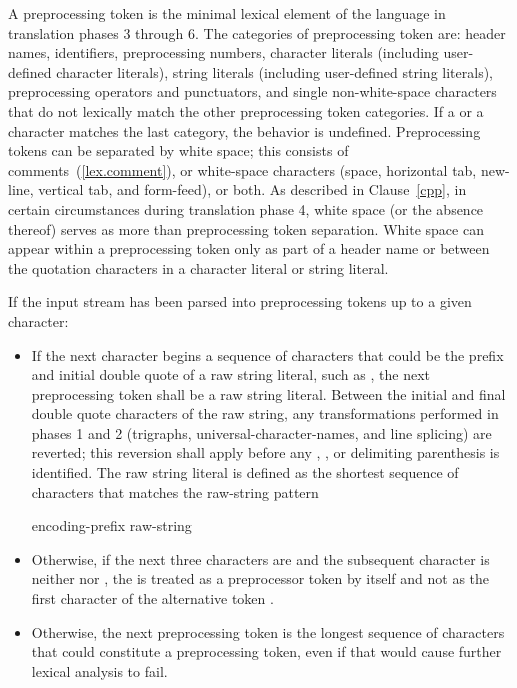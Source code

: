 \pnum
A preprocessing token is the minimal lexical element of the language in translation
phases 3 through 6. The categories of preprocessing token are: header names,
identifiers, preprocessing numbers, character literals (including user-defined character
literals), string literals (including user-defined string literals), preprocessing
operators and punctuators, and single non-white-space characters that do not lexically
match the other preprocessing token categories. If a  or a  character
matches the last category, the behavior is undefined. Preprocessing tokens can be
separated by
%
white space;
%
this consists of comments~(\ref{lex.comment}), or white-space
characters (space, horizontal tab, new-line, vertical tab, and
form-feed), or both. As described in Clause~\ref{cpp}, in certain
circumstances during translation phase 4, white space (or the absence
thereof) serves as more than preprocessing token separation. White space
can appear within a preprocessing token only as part of a header name or
between the quotation characters in a character literal or string
literal.

\pnum
If the input stream has been parsed into preprocessing tokens up to a
given character:

\begin{itemize}
\item If the next character begins a sequence of characters that could be the prefix
and initial double quote of a raw string literal, such as , the next preprocessing
token shall be a raw string literal. Between the initial and final
double quote characters of the raw string, any transformations performed in phases
1 and 2 (trigraphs, universal-character-names, and line splicing) are reverted; this reversion
shall apply before any , , or delimiting
parenthesis is identified. The raw string literal is defined as the shortest sequence
of characters that matches the raw-string pattern

\begin{ncsimplebnf}
encoding-prefix\opt {} raw-string
\end{ncsimplebnf}

\item Otherwise, if the next three characters are \tcode{<::} and the subsequent character
is neither \tcode{:} nor \tcode{>}, the \tcode{<} is treated as a preprocessor token by
itself and not as the first character of the alternative token \tcode{<:}.

\item Otherwise,
the next preprocessing token is the longest sequence of
characters that could constitute a preprocessing token, even if that
would cause further lexical analysis to fail.
\end{itemize}

